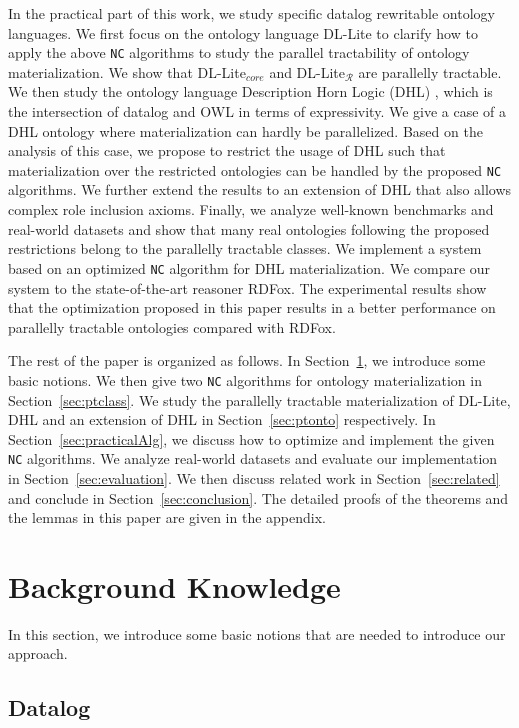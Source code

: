 \documentclass[final,1p,times]{elsarticle}
\begin{document}
In the practical part of this work, we study specific datalog rewritable ontology languages.
We first focus on the ontology language DL-Lite to clarify how to apply the above \texttt{NC} algorithms
to study the parallel tractability of ontology materialization.
We show that DL-Lite$_{core}$ and DL-Lite$_\mathcal{R}$ are parallelly tractable.
We then study the ontology language Description Horn Logic (DHL) \cite{GrosofHVD03}, which is the intersection of datalog and OWL
in terms of expressivity. We give a case of a DHL ontology where materialization can hardly be parallelized.
Based on the analysis of this case, we propose to restrict the usage of DHL such that materialization over the
restricted ontologies can be handled by the proposed \texttt{NC} algorithms.
We further extend the results to an extension of DHL that also allows complex role inclusion axioms.
Finally, we analyze well-known benchmarks and real-world datasets and show that many real ontologies following the
proposed restrictions belong to the parallelly tractable classes.
We implement a system based on an optimized \texttt{NC} algorithm for DHL materialization.
We compare our system to the state-of-the-art reasoner RDFox.
The experimental results show that the optimization proposed in this paper results in a better performance on parallelly
tractable ontologies compared with RDFox.

The rest of the paper is organized as follows. In Section~\ref{sec:background}, we introduce some basic notions.
We then give two \texttt{NC} algorithms for ontology materialization in Section~\ref{sec:ptclass}.
We study the parallelly tractable materialization of DL-Lite, DHL and an extension of DHL in Section~\ref{sec:ptonto} respectively.
In Section~\ref{sec:practicalAlg},
we discuss how to optimize and implement the given \texttt{NC} algorithms.
We analyze real-world datasets and evaluate our implementation in Section~\ref{sec:evaluation}.
We then discuss related work in Section~\ref{sec:related} and conclude in Section~\ref{sec:conclusion}.
The detailed proofs of the theorems and the lemmas in this paper are given in the appendix.


\section{Background Knowledge}
\label{sec:background}

In this section, we introduce some basic notions that are needed to introduce our approach.


\subsection{Datalog}
\end{document}
